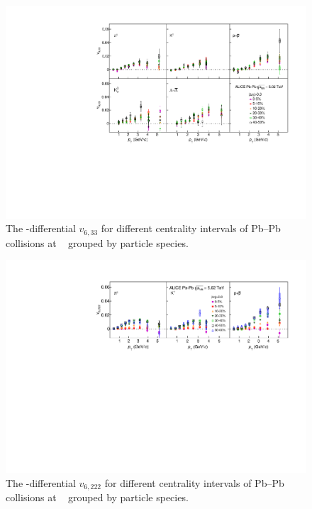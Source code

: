 \begin{figure}[!htb]
\begin{center}
\includegraphics[scale=0.82]{figures/results/All_v633_gap00_CentDep_PID2.pdf}
\end{center}
\caption{The \pT-differential $v_{6,33}$ for different centrality intervals of Pb--Pb collisions at \sNN~ grouped by particle species.}
\label{v633_centralityDependence}
\end{figure}

\begin{figure}[!htb]
\begin{center}
\includegraphics[scale=0.82]{figures/results/All_v6222_gap00_CentDep_PID2.pdf}
\end{center}
\caption{The \pT-differential $v_{6,222}$ for different centrality intervals of Pb--Pb collisions at \sNN~ grouped by particle species.}
\label{v6222_centralityDependence}
\end{figure}

